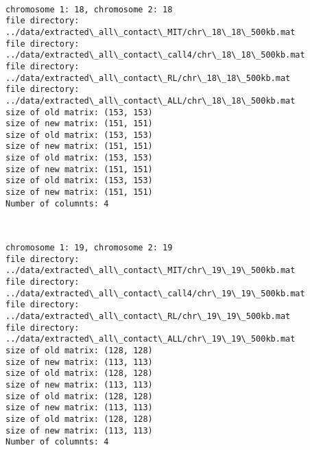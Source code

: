 \documentclass[11pt]{article}
\begin{document}
    \begin{center}
    \end{center}
    { \hspace*{\fill} \\}
    
    \begin{Verbatim}[commandchars=\\\{\}]
chromosome 1: 18, chromosome 2: 18
file directory: ../data/extracted\_all\_contact\_MIT/chr\_18\_18\_500kb.mat
file directory: ../data/extracted\_all\_contact\_call4/chr\_18\_18\_500kb.mat
file directory: ../data/extracted\_all\_contact\_RL/chr\_18\_18\_500kb.mat
file directory: ../data/extracted\_all\_contact\_ALL/chr\_18\_18\_500kb.mat
size of old matrix: (153, 153)
size of new matrix: (151, 151)
size of old matrix: (153, 153)
size of new matrix: (151, 151)
size of old matrix: (153, 153)
size of new matrix: (151, 151)
size of old matrix: (153, 153)
size of new matrix: (151, 151)
Number of columnts: 4

    \end{Verbatim}

    \begin{center}
    \end{center}
    { \hspace*{\fill} \\}
    
    \begin{Verbatim}[commandchars=\\\{\}]
chromosome 1: 19, chromosome 2: 19
file directory: ../data/extracted\_all\_contact\_MIT/chr\_19\_19\_500kb.mat
file directory: ../data/extracted\_all\_contact\_call4/chr\_19\_19\_500kb.mat
file directory: ../data/extracted\_all\_contact\_RL/chr\_19\_19\_500kb.mat
file directory: ../data/extracted\_all\_contact\_ALL/chr\_19\_19\_500kb.mat
size of old matrix: (128, 128)
size of new matrix: (113, 113)
size of old matrix: (128, 128)
size of new matrix: (113, 113)
size of old matrix: (128, 128)
size of new matrix: (113, 113)
size of old matrix: (128, 128)
size of new matrix: (113, 113)
Number of columnts: 4

    \end{Verbatim}

    \begin{center}
    \end{center}
    { \hspace*{\fill} \\}
    
\end{document}
